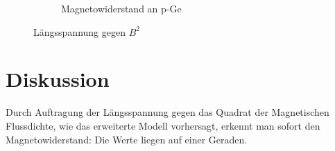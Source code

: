 \documentclass[12pt,a4paper,twopage]{article}
\begin{document}
\begin{figure}
\begin{subfigure}{0.4\textwidth}
\caption{Magnetowiderstand an p-Ge}
\end{subfigure}
\caption{Längsspannung gegen $B^2$}
\end{figure}


\section{Diskussion}		

Durch Auftragung der Längsspannung gegen das Quadrat der Magnetischen Flussdichte, wie das erweiterte Modell vorhersagt, erkennt man sofort den Magnetowiderstand: Die Werte liegen auf einer Geraden.
																								
\end{document}
